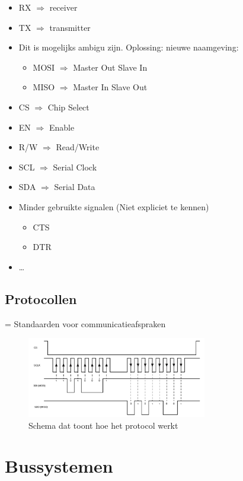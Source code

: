 \documentclass{article}
\begin{document}
\begin{itemize}
    \item RX $\Rightarrow$ receiver
    \item TX $\Rightarrow$ transmitter
    \item Dit is mogelijks ambigu zijn. Oplossing: nieuwe naamgeving:
    \begin{itemize}
        \item MOSI $\Rightarrow$ Master Out Slave In
        \item MISO $\Rightarrow$ Master In Slave Out
    \end{itemize}
    \item CS $\Rightarrow$ Chip Select
    \item EN $\Rightarrow$ Enable
    \item R/W $\Rightarrow$ Read/Write
    \item SCL $\Rightarrow$ Serial Clock
    \item SDA $\Rightarrow$ Serial Data
    \item Minder gebruikte signalen (Niet expliciet te kennen)
    \begin{itemize}
        \item CTS 
        \item DTR
    \end{itemize}
    \item \dots
\end{itemize}

\subsection{Protocollen}
= Standaarden voor communicatieafspraken

\begin{figure}[H]
    \centering
    \includegraphics[width=0.7\textwidth]{Screenshot_20200323_124324.png}
    \caption{Schema dat toont hoe het protocol werkt}
\end{figure}

\section{Bussystemen}
\end{document}
